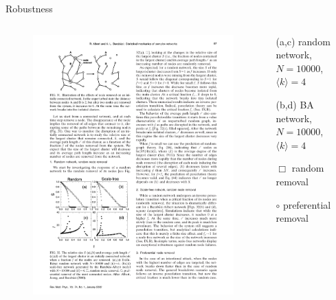 \begin{frame}{Robustness}
	
\begin{columns}
\begin{column}{0.65\textwidth}
\begin{figure}
	\includegraphics[width=\textwidth]{figs/08/robustness2.pdf}
\end{figure}
\end{column}
\begin{column}{0.32\textwidth}
\BI
\item[(a,c)] random network, $N=10000$, $\langle k \rangle = 4$
\item[(b,d)] BA network, $N=10000$, $\langle k \rangle = 4$
\EI

\bigskip
\BI
\item[$\Box$] random removal\\
\item[$\circ$] preferential removal
\EI
\end{column}
\end{columns}




\end{frame}
